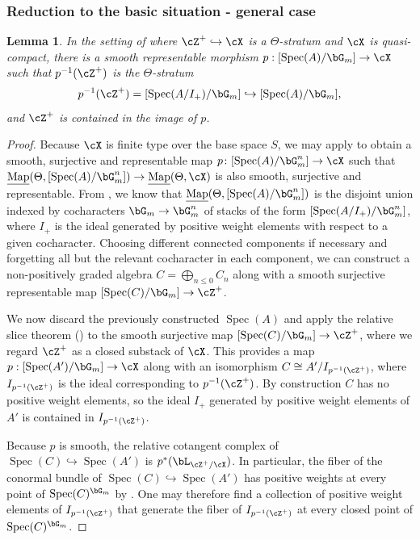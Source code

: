 \documentclass[a4paper]{amsart}
\numberwithin{equation}{section}
\theoremstyle{plain}
\newtheorem{lem}[thm]{Lemma}
\theoremstyle{definition}
\DeclareMathOperator{\Spec}{Spec}
\newcommand{\hookarr}{\hookrightarrow}
\newcommand{\uMap}{\underline{{\rm Map}}}
\newcommand{\co}{\colon}
\begin{document}
\subsubsection{Reduction to the basic situation - general case}
\begin{lem} \label{L:stratum_chart}
In the setting of  where $\cZ^+ \hookarr \cX$ is a $\Theta$-stratum and $\cX$ is quasi-compact, there is a smooth representable morphism $p : [\Spec(A)/\bG_m] \to \cX$ such that $p^{-1}(\cZ^+)$ is the $\Theta$-stratum
\[
 p^{-1}(\cZ^+) = [\Spec(A/I_+) / \bG_m] \hookrightarrow [\Spec(A)/ \bG_m],
\]
and $\cZ^+$ is contained in the image of $p$.
\end{lem}
\begin{proof}
Because $\cX$ is finite type over the base space $S$, we may apply  to obtain a smooth, surjective and representable map $p \co [\Spec(A)/\bG_m^n] \to \cX$ such that $\uMap(\Theta,[\Spec(A)/\bG_m^n]) \to \uMap(\Theta,\cX)$ is also smooth, surjective and representable. From , we know that $\uMap(\Theta,[\Spec(A)/\bG_m^n])$ is the disjoint union indexed by cocharacters $\bG_m \to \bG_m^n$ of stacks of the form $[\Spec(A/I_+) / \bG_m^n]$, where $I_+$ is the ideal generated by positive weight elements with respect to a given cocharacter. Choosing different connected components if necessary and forgetting all but the relevant cocharacter in each component, we can construct a non-positively graded algebra $C = \bigoplus_{n \leq 0} C_n$ along with a smooth surjective representable map $[\Spec(C)/\bG_m] \to \cZ^+$.


We now discard the previously constructed $\Spec(A)$ and apply the relative slice theorem () to the smooth surjective map $[\Spec(C)/\bG_m] \to \cZ^+$, where we regard $\cZ^+$ as a closed substack of $\cX$. This provides a map $p : [\Spec(A')/\bG_m] \to \cX$ along with an isomorphism $C \cong A' / I_{p^{-1}(\cZ^+)}$, where $I_{p^{-1}(\cZ^+)}$ is the ideal corresponding to $p^{-1}(\cZ^+)$. By construction $C$ has no positive weight elements, so the ideal $I_+$ generated by positive weight elements of $A'$ is contained in $I_{p^{-1}(\cZ^+)}$.

Because $p$ is smooth, the relative cotangent complex of $\Spec(C) \hookrightarrow \Spec(A')$ is $p^\ast(\bL_{\cZ^+/\cX})$. In particular, the fiber of the conormal bundle of $\Spec(C) \hookrightarrow \Spec(A')$ has positive weights at every point of $\Spec(C)^{\bG_m}$ by . One may therefore find a collection of positive weight elements of $I_{p^{-1}(\cZ^+)}$ that generate the fiber of $I_{p^{-1}(\cZ^+)}$ at every closed point of $\Spec(C)^{\bG_m}$.


\end{proof}
\end{document}
